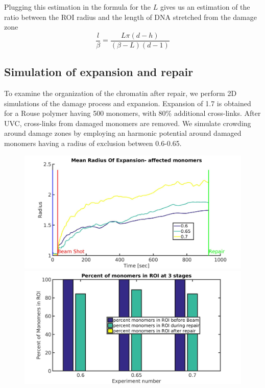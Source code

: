 \documentclass[12pt]{report}
\begin{document}
		Plugging this estimation in the formula for the $L$ gives us an estimation of the ratio between the ROI radius and the length of DNA stretched from the damage zone
		\begin{equation}\label{eq:ratioOfDNALengthToRoiRadius}
		\frac{l}{\beta} = \frac{L\pi(d-h)}{(\beta-L)(d-1)}
		\end{equation}				
		
		\subsection{Simulation of expansion and repair}\label{subsection:SimulationOfExpansionAndRepair}
		To examine the organization of the chromatin after repair, we perform 2D simulations of the damage process and expansion. Expansion of 1.7 is obtained for a Rouse polymer having 500 monomers, with 80\% additional cross-links. 		
		After UVC, cross-links from damaged monomers are removed. We simulate crowding around damage zones by employing an harmonic potential around damaged monomers having a radius of exclusion between 0.6-0.65.
		
		
				
	\begin{figure}[H]
	\includegraphics[width=0.5\linewidth, height=0.3\textheight]{Images/Simulations/meanRadiusOfExpansionAffected}
	\includegraphics[width=0.5\linewidth, height=0.3\textheight]{Images/Simulations/percentOfMonomersInROI}
	\caption{}
	\label{fig:meanRadiusOfExpansionAffected}
	\end{figure}
\end{document}

